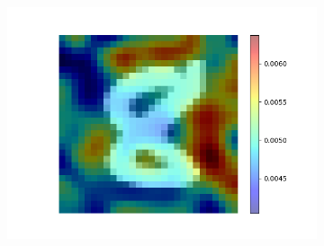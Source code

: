 \documentclass[a4paper]{scrartcl}
\begin{document}
\begin{figure}[btp]
\begin{subfigure}[t]{0.3\textwidth}
            \centering
            \includegraphics[width=\textwidth]{img/plots/attention_visualization_bad_1}
        \end{subfigure}


\end{figure}
\end{document}
